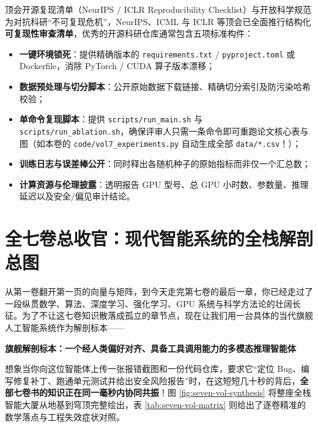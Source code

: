 \begin{extBox}{顶会开源复现清单（NeurIPS / ICLR Reproducibility Checklist）与开放科学规范}
为对抗科研“不可复现危机”，NeurIPS、ICML 与 ICLR 等顶会已全面推行结构化\textbf{可复现性审查清单}，优秀的开源科研仓库通常包含五项标准构件：
\begin{itemize}
  \item \textbf{一键环境锁死}：提供精确版本的 \texttt{requirements.txt} / \texttt{pyproject.toml} 或 Dockerfile，消除 PyTorch / CUDA 算子版本漂移；
  \item \textbf{数据预处理与切分脚本}：公开原始数据下载链接、精确切分索引及防污染哈希校验；
  \item \textbf{单命令复现脚本}：提供 \texttt{scripts/run\_main.sh} 与 \texttt{scripts/run\_ablation.sh}，确保评审人只需一条命令即可重跑论文核心表与图（如本卷的 \texttt{code/vol7\_experiments.py} 自动生成全部 \texttt{data/*.csv}！）；
  \item \textbf{训练日志与误差棒公开}：同时释出各随机种子的原始指标而非仅一个汇总数；
  \item \textbf{计算资源与伦理披露}：透明报告 GPU 型号、总 GPU 小时数、参数量、推理延迟以及安全/偏见审计结论。
\end{itemize}
\end{extBox}

\section{全七卷总收官：现代智能系统的全栈解剖总图}

从第一卷翻开第一页的向量与矩阵，到今天走完第七卷的最后一章，你已经走过了一段纵贯数学、算法、深度学习、强化学习、GPU 系统与科学方法论的壮阔长征。为了不让这七卷知识散落成孤立的章节点，现在让我们用一台具体的当代旗舰人工智能系统作为解剖标本——

\begin{center}
  \textbf{\color{tealDark}旗舰解剖标本：一个经人类偏好对齐、具备工具调用能力的多模态推理智能体}
\end{center}

想象当你向这位智能体上传一张报错截图和一份代码仓库，要求它“定位 Bug、编写修复补丁、跑通单元测试并给出安全风险报告”时，在这短短几十秒的背后，\textbf{全部七卷书的知识正在同一毫秒内协同共振}！图 \ref{fig:seven-vol-synthesis} 将整座全栈智能大厦从地基到穹顶完整绘出，表 \ref{tab:seven-vol-matrix} 则给出了逐卷精准的数学落点与工程失效症状对照。


